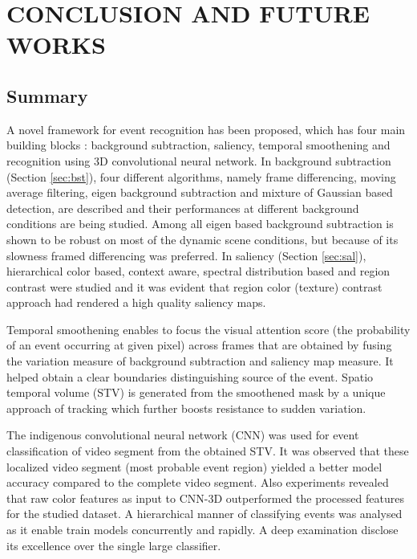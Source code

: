 \chapter{CONCLUSION AND FUTURE WORKS}
\label{chap:concl}

\section{Summary}
A novel framework for event recognition has been proposed, which has four main building blocks : background subtraction, saliency, temporal smoothening and recognition using 3D convolutional neural network.  In background subtraction (Section \ref{sec:bst}), four different algorithms, namely frame differencing, moving average filtering, eigen background subtraction and mixture of Gaussian based detection, are described and their performances at different background conditions are being studied.  Among all eigen based background subtraction is shown to be robust on most of the dynamic scene conditions, but because of its slowness framed differencing was preferred.  In saliency (Section \ref{sec:sal}), hierarchical color based, context aware, spectral distribution based and region contrast were studied and it was evident that region color (texture) contrast approach had rendered a high quality saliency maps.

\par Temporal smoothening enables to focus the visual attention score (the probability of an event occurring at given pixel) across frames that are obtained by fusing the variation measure of background subtraction and saliency map measure.  It helped obtain a clear boundaries distinguishing source of the event.  Spatio temporal volume (STV) is generated from the smoothened mask by a unique approach of tracking which further boosts resistance to sudden variation.

\par The indigenous convolutional neural network (CNN) was used for event classification of video segment from the  obtained STV.  It was observed that these localized video segment (most probable event region) yielded a better model accuracy compared to the complete video segment.  Also experiments revealed that raw color features as input to CNN-3D outperformed the processed features for the studied dataset.  A hierarchical manner of classifying events was analysed as it enable train models concurrently and rapidly.  A deep examination disclose its excellence over the single large classifier.

